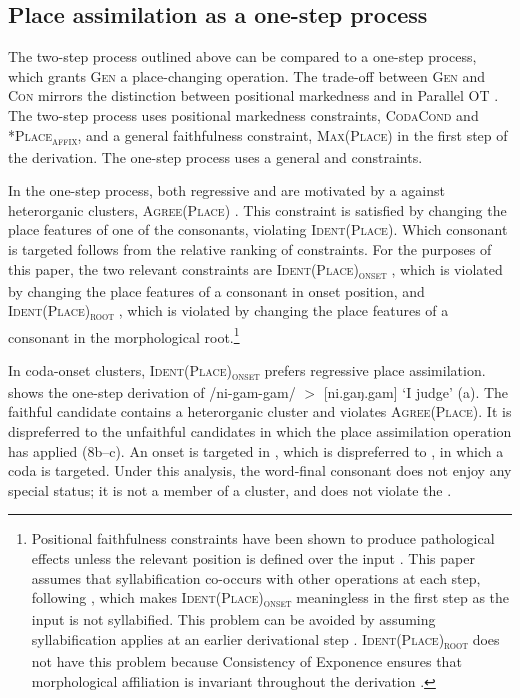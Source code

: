 \documentclass[output=paper,draftmode]{langscibook}
\begin{document}
{{\subsection{Place assimilation as a one-step process}

The two-step process outlined above can be compared to a one-step process, which grants \textsc{Gen} a place-changing operation. The trade-off between \textsc{Gen} and \textsc{Con} mirrors the distinction between positional markedness and  in Parallel OT \citep{zoll2004}. The two-step process uses positional markedness constraints, \textsc{CodaCond} and \textsc{*Place\textsubscript{affix}}, and a general faithfulness constraint, \textsc{Max(Place)} in the first step of the derivation. The one-step process uses a general  and  constraints.

In the one-step process, both regressive and  are motivated by a  against heterorganic clusters, \textsc{Agree(Place)} \citep{yip1991,lombardi1999,bakovic2000,bakovic2007}. This constraint is satisfied by changing the place features of one of the consonants, violating \textsc{Ident(Place)}. Which consonant is targeted follows from the relative ranking of  constraints. For the purposes of this paper, the two relevant constraints are \textsc{Ident(Place)\textsubscript{onset}} \citep{beckman1998}, which is violated by changing the place features of a consonant in onset position, and \textsc{Ident(Place)\textsubscript{root}} \citep{mccarthyprince1995}, which is violated by changing the place features of a consonant in the morphological root.\footnote{Positional faithfulness constraints have been shown to produce pathological effects unless the relevant position is defined over the input \citep{jesney2011}. This paper assumes that syllabification co-occurs with other operations at each step, following \citet{mccarthy2008}, which makes \textsc{Ident(Place)\textsubscript{onset}} meaningless in the first step as the input is not syllabified. This problem can be avoided by assuming syllabification applies at an earlier derivational step \citep{elfner2009}. \textsc{Ident(Place)\textsubscript{root}} does not have this problem because Consistency of Exponence ensures that morphological affiliation is invariant throughout the derivation \citep{mccarthyprince1993b}.}

In coda-onset clusters, \textsc{Ident(Place)\textsubscript{onset}} prefers regressive place assimilation.  shows the one-step derivation of /{ni-gam-gam}/ $>$ [{ni.gaŋ.gam}] `I judge' (a). The faithful candidate  contains a heterorganic cluster and violates \textsc{Agree(Place)}. It is dispreferred to the unfaithful candidates in which the place assimilation operation has applied (8b--c). An onset is targeted in , which is dispreferred to , in which a coda is targeted. Under this analysis, the word-final consonant does not enjoy any special status; it is not a member of a cluster, and does not violate the .

}}
\end{document}
